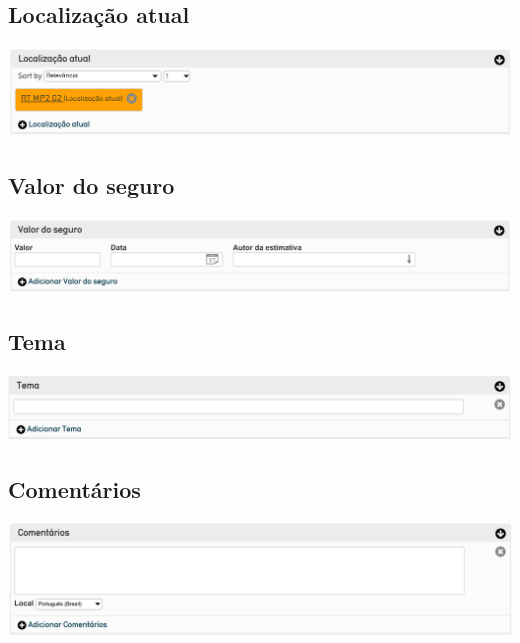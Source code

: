\subsection{Localização atual}
\begin{flushleft}
	\includegraphics[width=\linewidth]{elemento-14}
\end{flushleft}

\subsection{Valor do seguro}
\begin{flushleft}
	\includegraphics[width=\linewidth]{elemento-15}
\end{flushleft}

\subsection{Tema}
\begin{flushleft}
	\includegraphics[width=\linewidth]{elemento-16}
\end{flushleft}

\subsection{Comentários}
\begin{flushleft}
	\includegraphics[width=\linewidth]{elemento-17}
\end{flushleft}

